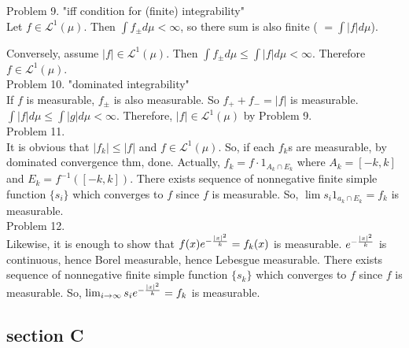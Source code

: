 \documentclass{amsart}
\begin{document}
Problem 9. "iff condition for (finite) integrability"\\

Let $f\in \mathcal{L}^1(\mu)$. Then $\int f_{\pm} d\mu < \infty$, so there sum is also finite ( $= \int \lvert f \rvert d\mu$).

Conversely, assume $\lvert f \rvert \in \mathcal{L}^1(\mu)$. Then $\int f_{\pm} d\mu \leq \int \lvert f \rvert d\mu < \infty$. Therefore $f \in \mathcal{L}^1(\mu)$.\\

Problem 10. "dominated integrability"\\

If $f$ is measurable, $f_{\pm}$ is also measurable. So $f_+ + f_- = \lvert f \rvert $ is measurable.
$\int \lvert f \rvert d\mu \leq \int \lvert g \rvert d\mu < \infty$. 
Therefore, $\lvert f \rvert \in \mathcal{L}^1(\mu)$ by Problem 9.\\

Problem 11. \\

It is obvious that $ \lvert f_k \rvert \leq \lvert f \rvert$ and $f \in \mathcal{L}^1(\mu)$.
So, if each $f_k$s are measurable, by dominated convergence thm, done.
Actually, $f_k = f \cdot 1_{A_k \cap E_k}$ where $A_k = \left [ -k, k \right ]$ and $E_k = f^{-1} (\left [ -k, k \right])$.
There exists sequence of nonnegative finite simple function $\{s_i\}$ which converges to $f$ since $f$ is measurable.
So, $\lim s_i 1_{a_k \cap E_k} = f_k$ is measurable.\\

Problem 12. \\

Likewise, it is enough to show that $f(x) e^{-{ {\lvert x \rvert}^2 \over k}} = f_k(x)$ is measurable.
$e^{-{ {\lvert x \rvert}^2 \over k}}$ is continuous, hence Borel measurable, hence Lebesgue measurable.
There exists sequence of nonnegative finite simple function $\{s_k \}$ which converges to $f$ since $f$ is measurable.
So, $\lim_{i \rightarrow \infty} s_i e^{-{ {\lvert x \rvert}^2 \over k}} = f_k$ is measurable. \\

\subsection*{section C} \hfill \\
\end{document}
